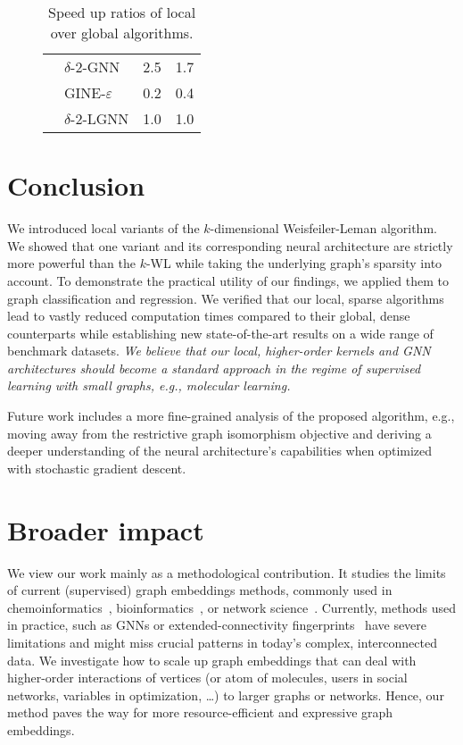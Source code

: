 \documentclass{article}
\theoremstyle{definition}
\newcommand{\kwl}{$k$-\textsf{WL}\xspace}
\newcommand{\gineeps}{\textsf{GINE-$\varepsilon$}\xspace}
\begin{document}
\begin{table}
\begin{center}
\begin{subfigure}[c,top]{0.48\textwidth}
{\begin{tabular}{@{}c<{\enspace}@{}lcc@{}}
					& \textsf{$\delta$-$2$-GNN}                     &          2.5          &           1.7            \\
					\cmidrule{2-4}      
					& \gineeps                                 &          0.2          &           0.4            \\
					& \textsf{$\delta$-$2$-LGNN}                      &          1.0          &           1.0            \\ \bottomrule
			\end{tabular}}
			\vspace{0pt}
		\end{subfigure}
	\end{center}
	\caption{Speed up ratios of local over global algorithms.}\label{add}
\end{table}
\section{Conclusion}
We introduced local variants of the $k$-dimensional Weisfeiler-Leman algorithm. We showed that one variant and its corresponding neural architecture are strictly more powerful than the \kwl while taking the underlying graph's sparsity into account. To demonstrate the practical utility of our findings, we applied them to graph classification and regression. We verified that our local, sparse algorithms lead to vastly reduced computation times compared to their global, dense counterparts while establishing new state-of-the-art results on a wide range of benchmark datasets. \emph{We believe that our local, higher-order kernels and GNN architectures should become a standard approach in the regime of supervised learning with small graphs, e.g., molecular learning.} 

Future work includes a more fine-grained analysis of the proposed algorithm, e.g., moving away from the restrictive graph isomorphism objective and deriving a deeper understanding of the neural architecture's capabilities when optimized with stochastic gradient descent.

 

\section*{Broader impact}
We view our work mainly as a methodological contribution. It studies the limits of current (supervised) graph embeddings methods, commonly used in chemoinformatics~\cite{Sto+2020}, bioinformatics~\cite{Barabasi2004}, or network science~\cite{Eas+2010}. Currently, methods used in practice, such as GNNs or extended-connectivity fingerprints~\cite{Rogers2010} have severe limitations and might miss crucial patterns in today's complex, interconnected data. We investigate how to scale up graph embeddings that can deal with higher-order interactions of vertices (or atom of molecules, users in social networks, variables in optimization, \dots) to larger graphs or networks.  Hence, our method paves the way for more resource-efficient and expressive graph embeddings.
\end{document}
